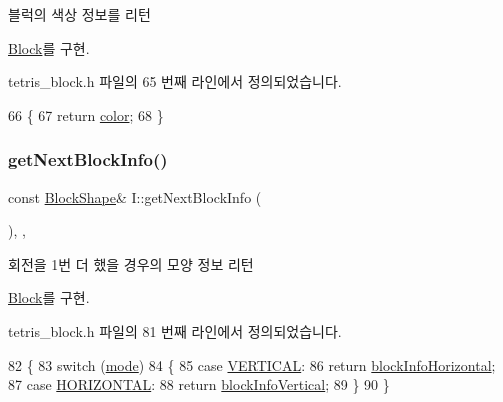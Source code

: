 블럭의 색상 정보를 리턴 



\mbox{\hyperlink{class_block_af10efef648f21dc708e42e149cd6fbcf}{Block}}를 구현.



tetris\+\_\+block.\+h 파일의 65 번째 라인에서 정의되었습니다.


\begin{DoxyCode}
66     \{
67         \textcolor{keywordflow}{return} \mbox{\hyperlink{class_i_a526ab692f8757d9d3ff3da5ca231b8a0}{color}};
68     \}
\end{DoxyCode}
\mbox{\label{class_i_ae5a6c09baa0575ff54446278a32a900a}} 
\subsubsection{\texorpdfstring{get\+Next\+Block\+Info()}{getNextBlockInfo()}}
{\footnotesize\ttfamily const \mbox{\hyperlink{class_block_aca5d951639f113e2ebd7856209d6b9ab}{Block\+Shape}}\& I\+::get\+Next\+Block\+Info (\begin{DoxyParamCaption}{ }\end{DoxyParamCaption})\hspace{0.3cm}{\ttfamily [inline]}, {\ttfamily [override]}, {\ttfamily [virtual]}}



회전을 1번 더 했을 경우의 모양 정보 리턴 



\mbox{\hyperlink{class_block_a654da164e0493be9de6f2f2334bc73e8}{Block}}를 구현.



tetris\+\_\+block.\+h 파일의 81 번째 라인에서 정의되었습니다.


\begin{DoxyCode}
82     \{
83         \textcolor{keywordflow}{switch} (\mbox{\hyperlink{class_i_a97884fed99bc779803178b5c3f4bc02d}{mode}})
84         \{
85         \textcolor{keywordflow}{case} \mbox{\hyperlink{class_block_a33a96023993478ad4b52426188454765a76628d7877667ccb2f6e549b89466a4a}{VERTICAL}}:
86             \textcolor{keywordflow}{return} \mbox{\hyperlink{class_i_af8e5eabbd3a5e1fef9066d3a6fa44adc}{blockInfoHorizontal}};
87         \textcolor{keywordflow}{case} \mbox{\hyperlink{class_block_a33a96023993478ad4b52426188454765a883bda1b4a0cb6d25d8b3c3465f0cfef}{HORIZONTAL}}:
88             \textcolor{keywordflow}{return} \mbox{\hyperlink{class_i_a78fdc2abb810f708c2595846c74ad1ca}{blockInfoVertical}};
89         \}
90     \}
\end{DoxyCode}
\mbox{\label{class_i_a5ee89d0f1ddc27429dfd0c83edf86ad5}} 
